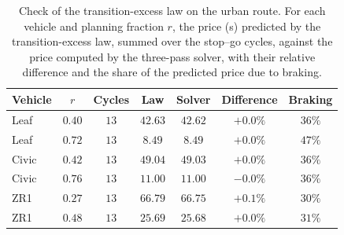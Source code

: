 \begin{table}[htbp]
\centering\small
\caption{Check of the transition-excess law on the urban route. For each vehicle and planning fraction $r$, the price (s) predicted by the transition-excess law, summed over the stop--go cycles, against the price computed by the three-pass solver, with their relative difference and the share of the predicted price due to braking.}\label{tab:app-excess}
\begin{tabular}{lcccccc}
\toprule
Vehicle & $r$ & Cycles & Law & Solver & Difference & Braking\\
\midrule
Leaf & $0.40$ & $13$ & $42.63$ & $42.62$ & $+0.0\%$ & $36\%$\\
Leaf & $0.72$ & $13$ & $8.49$ & $8.49$ & $+0.0\%$ & $47\%$\\
Civic & $0.42$ & $13$ & $49.04$ & $49.03$ & $+0.0\%$ & $36\%$\\
Civic & $0.76$ & $13$ & $11.00$ & $11.00$ & $-0.0\%$ & $36\%$\\
ZR1 & $0.27$ & $13$ & $66.79$ & $66.75$ & $+0.1\%$ & $30\%$\\
ZR1 & $0.48$ & $13$ & $25.69$ & $25.68$ & $+0.0\%$ & $31\%$\\
\bottomrule
\end{tabular}
\end{table}
